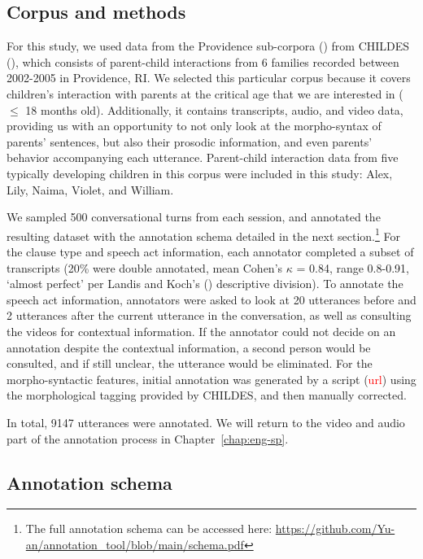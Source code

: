 \subsection{Corpus and methods}
\label{sec:engcl:corpus:methods}
For this study, we used data from the Providence sub-corpora (\cite{ProvidenceCorpus}) from CHILDES (\cite{CHILDES}), which consists of parent-child interactions from 6 families recorded between 2002-2005 in Providence, RI. We selected this particular corpus because it covers children’s interaction with parents at the critical age that we are interested in ($\leq$ 18 months old). Additionally, it contains transcripts, audio, and video data, providing us with an opportunity to not only look at the morpho-syntax of parents’ sentences, but also their prosodic information, and even parents’ behavior accompanying each utterance. Parent-child interaction data from five typically developing children in this corpus were included in this study: Alex, Lily, Naima, Violet, and William. %

We sampled 500 conversational turns from each session, and annotated the resulting dataset with the annotation schema detailed in the next section.\footnote{The full annotation schema can be accessed here: \url{https://github.com/Yu-an/annotation_tool/blob/main/schema.pdf}} For the clause type and speech act information, each annotator completed a subset of transcripts (20\% were double annotated, mean Cohen's $\kappa$ = 0.84, range 0.8-0.91, `almost perfect’ per Landis and Koch's (\cite*{landis1977iaa}) descriptive division). To annotate the speech act information, annotators were asked to look at 20 utterances before and 2 utterances after the current utterance in the conversation, as well as consulting the videos for contextual information. If the annotator could not decide on an annotation despite the contextual information, a second person would be consulted, and if still unclear, the utterance would be eliminated. For the morpho-syntactic features, initial annotation was generated by a script (\textcolor{red}{url}) using the morphological tagging provided by CHILDES, and then manually corrected. 

In total, 9147 utterances were annotated. We will return to the video and audio part of the annotation process in Chapter~\ref{chap:eng-sp}.




\subsection{Annotation schema}
\label{sec:engcl:corpus:schema}

